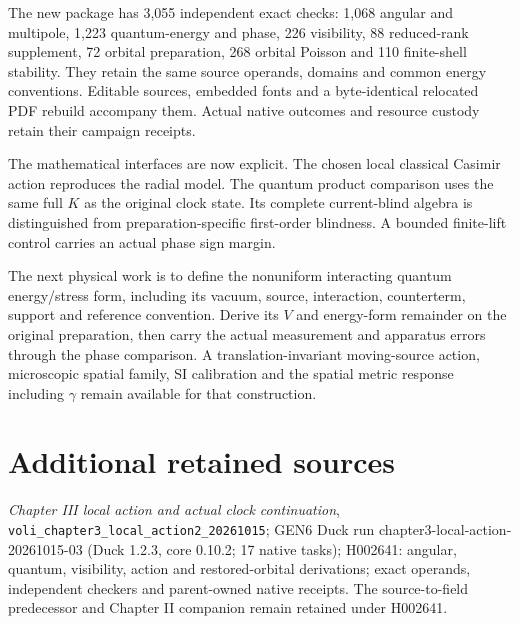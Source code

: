 \documentclass[10pt,twocolumn,letterpaper]{article}
\begin{document}
The new package has 3,055 independent exact checks: 1,068 angular and multipole, 1,223 quantum-energy and phase, 226 visibility, 88 reduced-rank supplement, 72 orbital preparation, 268 orbital Poisson and 110 finite-shell stability. They retain the same source operands, domains and common energy conventions. Editable sources, embedded fonts and a byte-identical relocated PDF rebuild accompany them. Actual native outcomes and resource custody retain their campaign receipts.

The mathematical interfaces are now explicit. The chosen local classical Casimir action reproduces the radial model. The quantum product comparison uses the same full $K$ as the original clock state. Its complete current-blind algebra is distinguished from preparation-specific first-order blindness. A bounded finite-lift control carries an actual phase sign margin.

The next physical work is to define the nonuniform interacting quantum energy/stress form, including its vacuum, source, interaction, counterterm, support and reference convention. Derive its $V$ and energy-form remainder on the original preparation, then carry the actual measurement and apparatus errors through the phase comparison. A translation-invariant moving-source action, microscopic spatial family, SI calibration and the spatial metric response including $\gamma$ remain available for that construction.

\section*{Additional retained sources}
{\footnotesize\raggedright
\noindent[8] \emph{Chapter III local action and actual clock continuation}, \nolinkurl{voli_chapter3_local_action2_20261015}; GEN6 Duck run chapter3-local-action-20261015-03 (Duck 1.2.3, core 0.10.2; 17 native tasks); H002641: angular, quantum, visibility, action and restored-orbital derivations; exact operands, independent checkers and parent-owned native receipts. The source-to-field predecessor and Chapter II companion remain retained under H002641.

\par}
\end{document}

